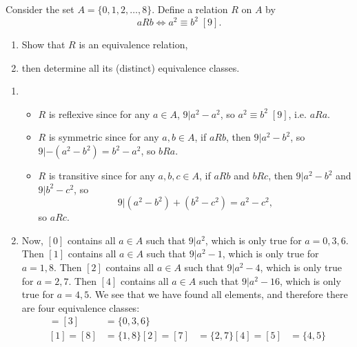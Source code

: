 \documentclass{article}
\theoremstyle{definition}
\begin{document}
\begin{question}
    Consider the set $A = \{0, 1, 2, \dots, 8 \}$. Define a relation $R$ on $A$ by
	\[
	a R b \iff a^2 \equiv b^2 \; [9].
	\]
	\begin{enumerate}
	\item Show that $R$ is an equivalence relation, 
	\item then determine all its (distinct) equivalence classes.
	\end{enumerate}
\end{question}
\begin{solution}
	\begin{enumerate}
	\item 
	\begin{itemize} 
		\item $ R$ is reflexive since for any $a \in A$, $9 | a^2 - a^2$, so $a^2 \equiv b^2 \; [9]$, i.e. $a  R a$.
		\item $ R$ is symmetric since for any $a,b \in A$, if $a  R b$, then $9 | a^2 - b^2$, so $9 | - (a^2 - b^2) = b^2 - a^2$, so $b  R a$.
		\item $ R$ is transitive since for any $a,b, c \in A$, if $a  R b$ and $b  R c$, then $9 | a^2 - b^2$ and $9 | b^2 - c^2$, so 
		\[
		9 | (a^ 2 - b^2) + (b^2 - c^2) = a^2 - c^2,
		\]
		so $a  R c$.
	\end{itemize}
	\item Now, $[0]$ contains all $a \in A$ such that $9 | a^2$, which is only true for $a = 0, 3, 6$. Then $[1]$ contains all $a \in A$ such that $9 | a^2 - 1$, which is only true for $a = 1, 8$. Then $[2]$ contains all $a \in A$ such that $9 | a^2 - 4$, which is only true for $a = 2, 7$. Then $[4]$ contains all $a \in A$ such that $9 | a^2 - 16$, which is only true for $a = 4, 5$. We see that we have found all elements, and therefore there are four equivalence classes:
		\begin{align*}
		[0] = [3] &= \{ 0, 3, 6 \} \\
		[1] = [8] &= \{ 1, 8 \}
		[2] = [7] &= \{ 2, 7 \}
		[4] = [5] &= \{ 4, 5 \}
		\end{align*}
	\end{enumerate}
\end{solution}
\end{document}
